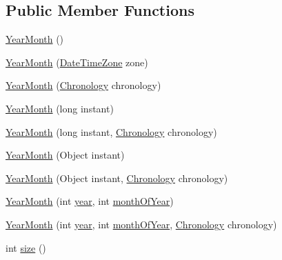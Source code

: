 \subsection*{Public Member Functions}
\begin{DoxyCompactItemize}
\item 
\hyperlink{classorg_1_1joda_1_1time_1_1_year_month_aff68b8d6a84f195394b3624d24ed8a1f}{Year\-Month} ()
\item 
\hyperlink{classorg_1_1joda_1_1time_1_1_year_month_a0dffbc463bdefe052dbd58067482e8aa}{Year\-Month} (\hyperlink{classorg_1_1joda_1_1time_1_1_date_time_zone}{Date\-Time\-Zone} zone)
\item 
\hyperlink{classorg_1_1joda_1_1time_1_1_year_month_a0a8966c38e854be38c2e205813b13984}{Year\-Month} (\hyperlink{classorg_1_1joda_1_1time_1_1_chronology}{Chronology} chronology)
\item 
\hyperlink{classorg_1_1joda_1_1time_1_1_year_month_a8aa4eb86a07285cbdaf1481e2aae785e}{Year\-Month} (long instant)
\item 
\hyperlink{classorg_1_1joda_1_1time_1_1_year_month_aece8a2cc3999b279b5cc24e10490a558}{Year\-Month} (long instant, \hyperlink{classorg_1_1joda_1_1time_1_1_chronology}{Chronology} chronology)
\item 
\hyperlink{classorg_1_1joda_1_1time_1_1_year_month_a1bfb47c5128793d2d6773b67519e0bda}{Year\-Month} (Object instant)
\item 
\hyperlink{classorg_1_1joda_1_1time_1_1_year_month_ae191e74a88845da41fe5a461b099ed2a}{Year\-Month} (Object instant, \hyperlink{classorg_1_1joda_1_1time_1_1_chronology}{Chronology} chronology)
\item 
\hyperlink{classorg_1_1joda_1_1time_1_1_year_month_ac29a10ea019d971aec1c2440fa90698a}{Year\-Month} (int \hyperlink{classorg_1_1joda_1_1time_1_1_year_month_a2c80ff29652d131575224c5aed2be17b}{year}, int \hyperlink{classorg_1_1joda_1_1time_1_1_year_month_a9c980b9a1d39f8d5dfdfe96fc983c0fb}{month\-Of\-Year})
\item 
\hyperlink{classorg_1_1joda_1_1time_1_1_year_month_a390a14d52f3ee63060728521fea23f1f}{Year\-Month} (int \hyperlink{classorg_1_1joda_1_1time_1_1_year_month_a2c80ff29652d131575224c5aed2be17b}{year}, int \hyperlink{classorg_1_1joda_1_1time_1_1_year_month_a9c980b9a1d39f8d5dfdfe96fc983c0fb}{month\-Of\-Year}, \hyperlink{classorg_1_1joda_1_1time_1_1_chronology}{Chronology} chronology)
\item 
int \hyperlink{classorg_1_1joda_1_1time_1_1_year_month_a1e7b0d2625a502922c7fa92052968ba6}{size} ()
\item 

\end{DoxyCompactItemize}
